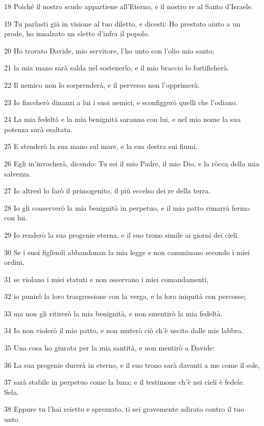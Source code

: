 \par 18 Poiché il nostro scudo appartiene all'Eterno, e il nostro re al Santo d'Israele.
\par 19 Tu parlasti già in visione al tuo diletto, e dicesti: Ho prestato aiuto a un prode, ho innalzato un eletto d'infra il popolo.
\par 20 Ho trovato Davide, mio servitore, l'ho unto con l'olio mio santo;
\par 21 la mia mano sarà salda nel sostenerlo, e il mio braccio lo fortificherà.
\par 22 Il nemico non lo sorprenderà, e il perverso non l'opprimerà.
\par 23 Io fiaccherò dinanzi a lui i suoi nemici, e sconfiggerò quelli che l'odiano.
\par 24 La mia fedeltà e la mia benignità saranno con lui, e nel mio nome la sua potenza sarà esaltata.
\par 25 E stenderò la sua mano sul mare, e la sua destra sui fiumi.
\par 26 Egli m'invocherà, dicendo: Tu sei il mio Padre, il mio Dio, e la ròcca della mia salvezza.
\par 27 Io altresì lo farò il primogenito, il più eccelso dei re della terra.
\par 28 Io gli conserverò la mia benignità in perpetuo, e il mio patto rimarrà fermo con lui.
\par 29 Io renderò la sua progenie eterna, e il suo trono simile ai giorni dei cieli.
\par 30 Se i suoi figliuoli abbandonan la mia legge e non camminano secondo i miei ordini,
\par 31 se violano i miei statuti e non osservano i miei comandamenti,
\par 32 io punirò la loro trasgressione con la verga, e la loro iniquità con percosse;
\par 33 ma non gli ritirerò la mia benignità, e non smentirò la mia fedeltà.
\par 34 Io non violerò il mio patto, e non muterò ciò ch'è uscito dalle mie labbra.
\par 35 Una cosa ho giurata per la mia santità, e non mentirò a Davide:
\par 36 La sua progenie durerà in eterno, e il suo trono sarà davanti a me come il sole,
\par 37 sarà stabile in perpetuo come la luna; e il testimone ch'è nei cieli è fedele. Sela.
\par 38 Eppure tu l'hai reietto e sprezzato, ti sei gravemente adirato contro il tuo unto.
